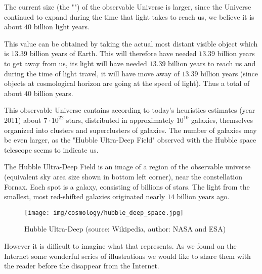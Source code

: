	The current size (the "") of the observable Universe is larger, since the Universe continued to expand during the time that light takes to reach us, we believe it is about $40$ billion light years.

	This value can be obtained by taking the actual most distant visible object which is $13.39$ billion years of Earth. This will therefore have needed $13.39$ billion years to get away from us, its light will have needed $13.39$ billion years to reach us and during the time of light travel, it will have move away of $13.39$ billion years (since objects at cosmological horizon are going at the speed of light). Thus a total of about $40$ billion years.
	
	This observable Universe contains according to today's heuristics  estimates (year 2011) about $7\cdot 10^{22}$ stars, distributed in approximately $10^{10}$ galaxies, themselves organized into clusters and superclusters of galaxies. The number of galaxies may be even larger, as the "Hubble Ultra-Deep Field" observed with the Hubble space telescope seems to indicate us. 
	
	The Hubble Ultra-Deep Field is an image of a region of the observable universe (equivalent sky area size shown in bottom left corner), near the constellation Fornax. Each spot is a galaxy, consisting of billions of stars. The light from the smallest, most red-shifted galaxies originated nearly $14$ billion years ago.
	\begin{figure}[H]
		\centering
		\texttt{[image: img/cosmology/hubble\_deep\_space.jpg]}
		\caption{Hubble Ultra-Deep (source: Wikipedia, author: NASA and ESA)}
	\end{figure}
	However it is difficult to imagine what that represents. As we found on the Internet some wonderful series of illustrations we would like to share them with the reader before the disappear from the Internet.

